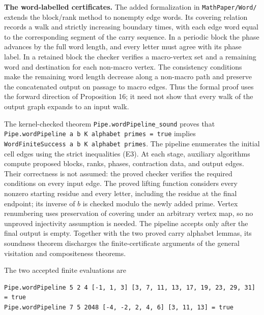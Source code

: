 \documentclass[11pt,reqno]{amsart}
\theoremstyle{definition}
\theoremstyle{remark}
\begin{document}
\textbf{The word-labelled certificates.} The added formalization in
\nolinkurl{MathPaper/Word/} extends the block/rank method to nonempty edge words.
Its covering relation records a walk and strictly increasing boundary
times, with each edge word equal to the corresponding segment of the
carry sequence. In a periodic block the phase advances by the full word
length, and every letter must agree with its phase label. In a retained
block the checker verifies a macro-vertex set and a remaining word and
destination for each non-macro vertex. The consistency conditions make
the remaining word length decrease along a non-macro path and preserve
the concatenated output on passage to macro edges. Thus the formal proof
uses the forward direction of Proposition 16; it need not show that
every walk of the output graph expands to an input walk.

The kernel-checked theorem \nolinkurl{Pipe.wordPipeline_sound} proves that
\texttt{Pipe.wordPipeline\ a\ b\ K\ alphabet\ primes\ =\ true} implies
\texttt{WordFiniteSuccess\ a\ b\ K\ alphabet\ primes}. The pipeline enumerates the
initial cell edges using the strict inequalities (E3). At each stage,
auxiliary algorithms compute proposed blocks, ranks, phases, contraction
data, and output edges. Their correctness is not assumed: the proved
checker verifies the required conditions on every input edge. The
proved lifting function considers every nonzero starting residue and
every letter, including the residue at the final endpoint; its inverse
of \(b\) is checked modulo the newly added prime. Vertex renumbering
uses preservation of covering under an arbitrary vertex map, so no
unproved injectivity assumption is needed. The pipeline accepts only
after the final output is empty. Together with the two proved carry
alphabet lemmas, its soundness theorem discharges the finite-certificate
arguments of the general visitation and compositeness theorems.

The two accepted finite evaluations are

\begin{Verbatim}[fontsize=\small,breaklines=true,breakanywhere=true]
Pipe.wordPipeline 5 2 4 [-1, 1, 3] [3, 7, 11, 13, 17, 19, 23, 29, 31] = true
Pipe.wordPipeline 7 5 2048 [-4, -2, 2, 4, 6] [3, 11, 13] = true
\end{Verbatim}
\end{document}
